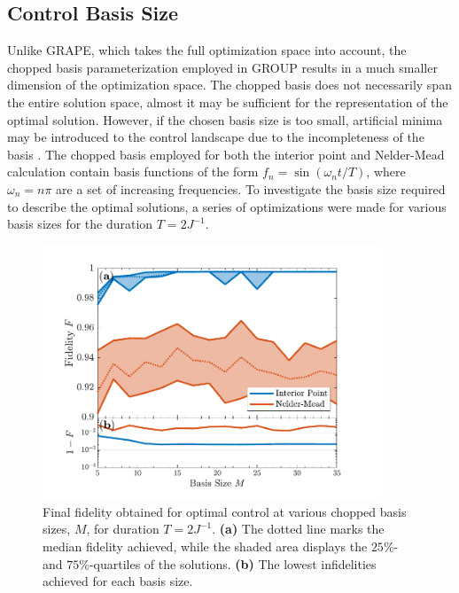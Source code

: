 \subsection{Control Basis Size}
Unlike GRAPE, which takes the full optimization space into account, the chopped basis parameterization employed in GROUP results in a much smaller dimension of the optimization space. The chopped basis does not necessarily span the entire solution space, almost it may be sufficient for the representation of the optimal solution. However, if the chosen basis size is too small, artificial minima may be introduced to the control landscape due to the incompleteness of the basis \cite{Rach2015}. 
The chopped basis employed for both the interior point and Nelder-Mead calculation contain basis functions of the form $f_n = \sin \left( \omega_n t / T \right)$, where $\omega_n = n \pi$ are a set of increasing frequencies.
To investigate the basis size required to describe the optimal solutions, a series of optimizations were made for various basis sizes for the duration $T = 2 J^{-1}$. 
\begin{figure}[h!]
    \centering
    \includegraphics[width=0.9\textwidth]{Figures/L5/FidelityBasisSize.pdf}
    \caption{Final fidelity obtained for optimal control at various chopped basis sizes, $M$, for duration $T = 2 J^{-1}$. \textbf{(a)} The dotted line marks the median fidelity achieved, while the shaded area displays the $25\%$- and $75\%$-quartiles of the solutions. \textbf{(b)} The lowest infidelities achieved for each basis size.}
    \label{fig:FidelityBasisSize}
\end{figure}

